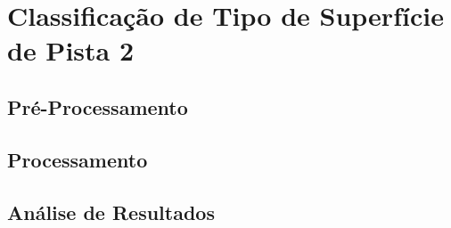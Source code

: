\chapter{Classificação de Tipo de Superfície de Pista 2}
\label{cap:classificacao_tipo_superficie_2}

\section{Pré-Processamento}
\section{Processamento}
\section{Análise de Resultados}

